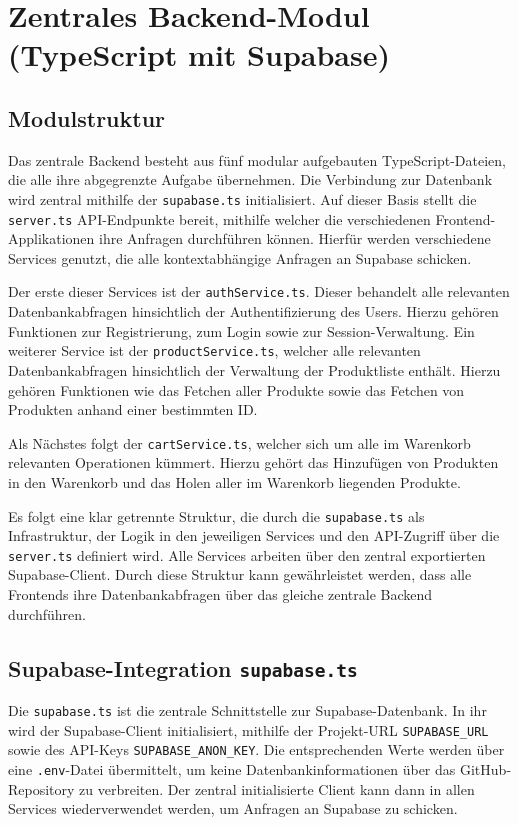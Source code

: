 \documentclass[oneside]{ausarbeitung}
\begin{document}
\section{Zentrales Backend-Modul (TypeScript mit Supabase)}
\subsection{Modulstruktur}

Das zentrale Backend besteht aus fünf modular aufgebauten TypeScript-Dateien, die alle ihre abgegrenzte Aufgabe übernehmen. Die Verbindung zur Datenbank wird zentral mithilfe der \texttt{supabase.ts} initialisiert. Auf dieser Basis stellt die \texttt{server.ts} API-Endpunkte bereit, mithilfe welcher die verschiedenen Frontend-Applikationen ihre Anfragen durchführen können. Hierfür werden verschiedene Services genutzt, die alle kontextabhängige Anfragen an Supabase schicken.

Der erste dieser Services ist der \texttt{authService.ts}. Dieser behandelt alle relevanten Datenbankabfragen hinsichtlich der Authentifizierung des Users. Hierzu gehören Funktionen zur Registrierung, zum Login sowie zur Session-Verwaltung. Ein weiterer Service ist der \texttt{productService.ts}, welcher alle relevanten Datenbankabfragen hinsichtlich der Verwaltung der Produktliste enthält. Hierzu gehören Funktionen wie das Fetchen aller Produkte sowie das Fetchen von Produkten anhand einer bestimmten ID.

Als Nächstes folgt der \texttt{cartService.ts}, welcher sich um alle im Warenkorb relevanten Operationen kümmert. Hierzu gehört das Hinzufügen von Produkten in den Warenkorb und das Holen aller im Warenkorb liegenden Produkte.

Es folgt eine klar getrennte Struktur, die durch die \texttt{supabase.ts} als Infrastruktur, der Logik in den jeweiligen Services und den API-Zugriff über die \texttt{server.ts} definiert wird. Alle Services arbeiten über den zentral exportierten Supabase-Client. Durch diese Struktur kann gewährleistet werden, dass alle Frontends ihre Datenbankabfragen über das gleiche zentrale Backend durchführen.

\subsection{Supabase-Integration \texttt{supabase.ts}}

Die \texttt{supabase.ts} ist die zentrale Schnittstelle zur Supabase-Datenbank. In ihr wird der Supabase-Client initialisiert, mithilfe der Projekt-URL \texttt{SUPABASE\_URL} sowie des API-Keys \texttt{SUPABASE\_ANON\_KEY}. Die entsprechenden Werte werden über eine \texttt{.env}-Datei übermittelt, um keine Datenbankinformationen über das GitHub-Repository zu verbreiten. Der zentral initialisierte Client kann dann in allen Services wiederverwendet werden, um Anfragen an Supabase zu schicken.
\end{document}

